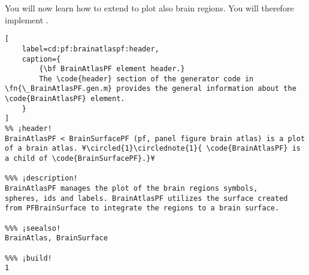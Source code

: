 \documentclass{tufte-handout}
\begin{document}
You will now learn how to extend  to plot also brain regions. You will therefore implement .

\begin{lstlisting}[
	label=cd:pf:brainatlaspf:header,
	caption={
		{\bf BrainAtlasPF element header.}
		The \code{header} section of the generator code in \fn{\_BrainAtlasPF.gen.m} provides the general information about the \code{BrainAtlasPF} element.
	}
]
%% ¡header!
BrainAtlasPF < BrainSurfacePF (pf, panel figure brain atlas) is a plot of a brain atlas. ¥\circled{1}\circlednote{1}{ \code{BrainAtlasPF} is a child of \code{BrainSurfacePF}.}¥

%%% ¡description!
BrainAtlasPF manages the plot of the brain regions symbols,
spheres, ids and labels. BrainAtlasPF utilizes the surface created
from PFBrainSurface to integrate the regions to a brain surface.

%%% ¡seealso!
BrainAtlas, BrainSurface

%%% ¡build!
1
\end{lstlisting}
\end{document}
